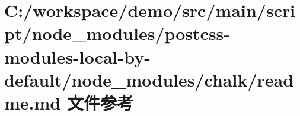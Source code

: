 \hypertarget{node__modules_2postcss-modules-local-by-default_2node__modules_2chalk_2_r_e_a_d_m_e_8md}{}\section{C\+:/workspace/demo/src/main/script/node\+\_\+modules/postcss-\/modules-\/local-\/by-\/default/node\+\_\+modules/chalk/readme.md 文件参考}
\label{node__modules_2postcss-modules-local-by-default_2node__modules_2chalk_2_r_e_a_d_m_e_8md}
